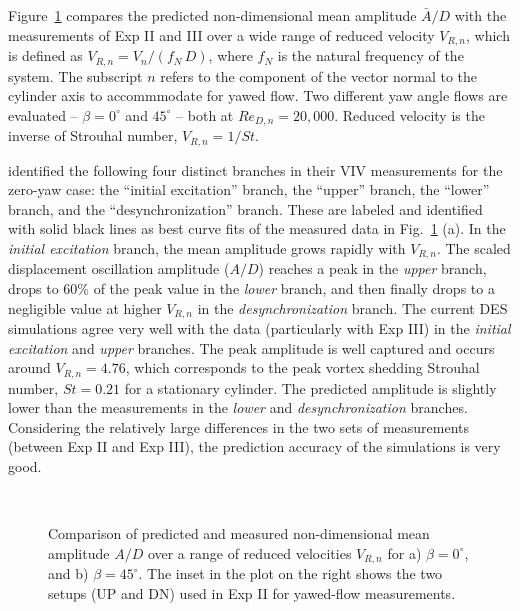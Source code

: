 Figure~\ref{fig:VIV_amp} compares the predicted non-dimensional
mean amplitude $\bar{A}/D$ with the measurements of Exp II and III over a wide
range of reduced velocity $V_{R,n}$, which is defined as
$V_{R,n}=V_n/(f_N\,D)$, where $f_N$ is the natural frequency of the system. The
subscript $n$ refers to the component of the vector normal to the cylinder axis
to accommmodate for yawed flow. Two different yaw angle flows are evaluated --
$\beta=0^\circ$ and $45^\circ$ -- both at $Re_{D,n}=20,000$. Reduced velocity
is the inverse of Strouhal number, $V_{R,n} = 1/St$.

\citet{khalak1997fluid} identified the following four distinct branches in
their VIV measurements for the zero-yaw case: the ``initial excitation''
branch, the ``upper'' branch, the ``lower'' branch, and the
``desynchronization'' branch. These are labeled and identified with solid black
lines as best curve fits of the measured data in Fig.~\ref{fig:VIV_amp} (a). In
the {\em initial excitation} branch, the mean amplitude grows rapidly with $V_{R,n}$.
The scaled displacement oscillation amplitude ($A/D$) reaches a peak in the
{\em upper} branch, drops to 60\% of the peak value in the {\em lower} branch, and then
finally drops to a negligible value at higher $V_{R,n}$ in the
{\em desynchronization} branch. The current DES simulations agree very well with the
data (particularly with Exp III) in the {\em initial excitation} and {\em upper} branches.
The peak amplitude is well captured and occurs around $V_{R,n}=4.76$, which
corresponds to the peak vortex shedding Strouhal number, $St=0.21$ for a
stationary cylinder. The predicted amplitude is slightly lower than the
measurements in the {\em lower} and {\em desynchronization} branches. Considering the
relatively large differences in the two sets of measurements (between Exp II
and Exp III), the prediction accuracy of the simulations is very good.
%
\begin{figure}[htb!]
  \centering
   {}
  \qquad
   \\
    \caption{Comparison of predicted and measured non-dimensional mean
      amplitude $A/D$ over a range of reduced velocities $V_{R,n}$ for a)
      $\beta=0^\circ$, and b) $\beta=45^\circ$. The inset in the plot on the right
      shows the two setups (UP and DN) used in Exp II for yawed-flow
      measurements.} 
  \label{fig:VIV_amp}
\end{figure}

